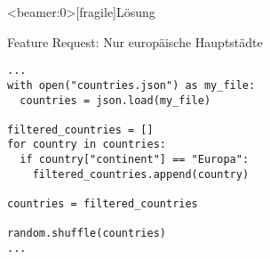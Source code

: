 \begin{frame}<beamer:0>[fragile]{Lösung}
	
\begin{solutionblock}{Feature Request: Nur europäische Hauptstädte}
\begin{verbatim}
...
with open("countries.json") as my_file:
  countries = json.load(my_file)

filtered_countries = []
for country in countries: 
  if country["continent"] == "Europa": 
    filtered_countries.append(country)

countries = filtered_countries

random.shuffle(countries)
...
\end{verbatim}
\end{solutionblock}
\end{frame}










